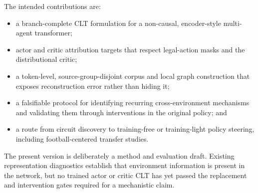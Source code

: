 The intended contributions are:
\begin{itemize}
    \item a branch-complete CLT formulation for a non-causal, encoder-style multi-agent transformer;
    \item actor and critic attribution targets that respect legal-action masks and the distributional critic;
    \item a token-level, source-group-disjoint corpus and local graph construction that exposes reconstruction error rather than hiding it;
    \item a falsifiable protocol for identifying recurring cross-environment mechanisms and validating them through interventions in the original policy; and
    \item a route from circuit discovery to training-free or training-light policy steering, including football-centered transfer studies.
\end{itemize}

The present version is deliberately a method and evaluation draft. Existing representation diagnostics establish that environment information is present in the network, but no trained actor or critic CLT has yet passed the replacement and intervention gates required for a mechanistic claim.
